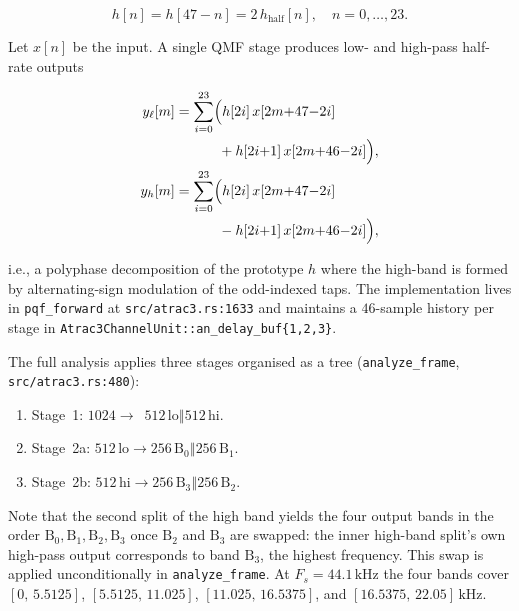 \documentclass[11pt]{article}
\begin{document}
\begin{equation}
    h[n] = h[47-n] = 2\,h_{\text{half}}[n],\quad n=0,\dots,23.
\end{equation}

Let \(x[n]\) be the input. A single QMF stage produces low- and high-pass
half-rate outputs

\begin{align}
y_{\ell}[m] &= \sum_{i=0}^{23}\!\Big(h[2i]\,x[2m{+}47{-}2i] \nonumber \\
            &\hphantom{= \sum_{i=0}^{23}\!\Big(} + h[2i{+}1]\,x[2m{+}46{-}2i]\Big), \label{eq:qmf_lo}\\
y_{h}[m]    &= \sum_{i=0}^{23}\!\Big(h[2i]\,x[2m{+}47{-}2i] \nonumber \\
            &\hphantom{= \sum_{i=0}^{23}\!\Big(} - h[2i{+}1]\,x[2m{+}46{-}2i]\Big), \label{eq:qmf_hi}
\end{align}

\noindent
i.e., a polyphase decomposition of the prototype \(h\) where the high-band is
formed by alternating-sign modulation of the odd-indexed taps. The
implementation lives in \texttt{pqf\_forward} at
\texttt{src/atrac3.rs:1633} and maintains a \(46\)-sample history per stage in
\texttt{Atrac3ChannelUnit::an\_delay\_buf\{1,2,3\}}.

The full analysis applies three stages organised as a tree
(\texttt{analyze\_frame}, \texttt{src/atrac3.rs:480}):

\begin{enumerate}
\itemsep0pt
\item Stage~1: \(1024\!\to\!\)~\(512\,\text{lo} \mathbin{\Vert} 512\,\text{hi}\).
\item Stage~2a: \(512\,\text{lo}\!\to\!256\,\text{B}_0 \mathbin{\Vert} 256\,\text{B}_1\).
\item Stage~2b: \(512\,\text{hi}\!\to\!256\,\text{B}_3 \mathbin{\Vert} 256\,\text{B}_2\).
\end{enumerate}

\noindent
Note that the second split of the high band yields the four output bands in
the order \(\text{B}_0, \text{B}_1, \text{B}_2, \text{B}_3\) once
\(\text{B}_2\) and \(\text{B}_3\) are swapped: the inner high-band split's
own high-pass output corresponds to band \(\text{B}_3\), the highest
frequency. This swap is applied unconditionally in
\texttt{analyze\_frame}. At \(F_s = 44.1\,\text{kHz}\) the four bands cover
\([0,\,5.5125]\), \([5.5125,\,11.025]\), \([11.025,\,16.5375]\), and
\([16.5375,\,22.05]\,\text{kHz}\).
\end{document}
